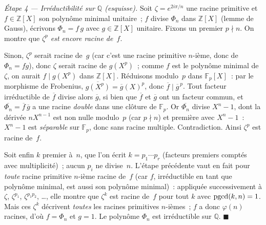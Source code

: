 \begin{mdframed}[style=proofbar]
  \medskip
  \textit{Étape 4 — Irréductibilité sur $\mathbb{Q}$ (esquisse).}
  Soit $\zeta=e^{2i\pi/n}$ une racine primitive et $f\in\mathbb{Z}[X]$ son
  polynôme minimal unitaire~; $f$ divise $\Phi_n$ dans $\mathbb{Z}[X]$ (lemme de
  Gauss), écrivons $\Phi_n=f\,g$ avec $g\in\mathbb{Z}[X]$ unitaire. Fixons un
  premier $p\nmid n$. On montre que \emph{$\zeta^p$ est encore racine de~$f$}.

  Sinon, $\zeta^p$ serait racine de~$g$ (car c'est une racine primitive
  $n$-ième, donc de $\Phi_n=fg$), donc $\zeta$ serait racine de $g(X^p)$~; comme
  $f$ est le polynôme minimal de $\zeta$, on aurait $f\mid g(X^p)$ dans
  $\mathbb{Z}[X]$. Réduisons modulo~$p$ dans $\mathbb{F}_p[X]$~: par le
  morphisme de Frobenius, $\overline{g(X^p)}=\overline{g}(X)^p$, donc
  $\overline f\mid \overline g^{\,p}$. Tout facteur irréductible de $\overline f$
  divise alors $\overline g$, si bien que $\overline f$ et $\overline g$ ont un
  facteur commun, et $\overline{\Phi_n}=\overline f\,\overline g$ a une racine
  \emph{double} dans une clôture de $\mathbb{F}_p$. Or $\overline{\Phi_n}$
  divise $X^n-1$, dont la dérivée $nX^{n-1}$ est non nulle modulo~$p$ (car
  $p\nmid n$) et première avec $X^n-1$~: $X^n-1$ est \emph{séparable} sur
  $\mathbb{F}_p$, donc sans racine multiple. Contradiction. Ainsi $\zeta^p$ est
  racine de~$f$.

  Soit enfin $k$ premier à~$n$, que l'on écrit $k=p_1\cdots p_r$ (facteurs
  premiers comptés avec multiplicité)~; aucun $p_i$ ne divise~$n$. L'étape
  précédente vaut en fait pour \emph{toute} racine primitive $n$-ième racine
  de~$f$ (car $f$, irréductible en tant que polynôme minimal, est aussi son
  polynôme minimal)~: appliquée successivement à $\zeta$, $\zeta^{p_1}$,
  $\zeta^{p_1p_2}$, \ldots, elle montre que $\zeta^k$ est racine de~$f$ pour
  tout $k$ avec $\operatorname{pgcd}(k,n)=1$. Mais ces $\zeta^k$ décrivent
  \emph{toutes} les racines primitives $n$-ièmes~; $f$ a donc $\varphi(n)$
  racines, d'où $f=\Phi_n$ et $g=1$. Le polynôme $\Phi_n$ est irréductible sur
  $\mathbb{Q}$.
  \hfill$\blacksquare$
\end{mdframed}

\decsep{}



